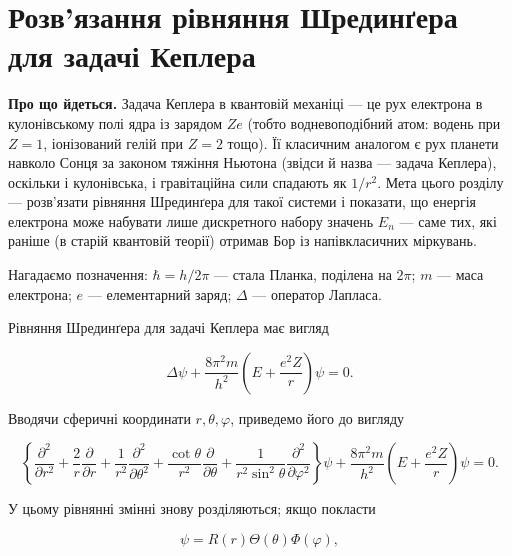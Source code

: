 \documentclass{article}
\begin{document}
\section*{Розв'язання рівняння Шрединґера для задачі Кеплера}

\begin{note}
\textbf{Про що йдеться.} Задача Кеплера в квантовій механіці --- це рух електрона в кулонівському полі ядра із зарядом $Ze$ (тобто водневоподібний атом: водень при $Z=1$, іонізований гелій при $Z=2$ тощо). Її класичним аналогом є рух планети навколо Сонця за законом тяжіння Ньютона (звідси й назва --- задача Кеплера), оскільки і кулонівська, і гравітаційна сили спадають як $1/r^2$. Мета цього розділу --- розв'язати рівняння Шрединґера для такої системи і показати, що енергія електрона може набувати лише дискретного набору значень $E_n$ --- саме тих, які раніше (в старій квантовій теорії) отримав Бор із напівкласичних міркувань.

Нагадаємо позначення: $\hbar = h/2\pi$ --- стала Планка, поділена на $2\pi$; $m$ --- маса електрона; $e$ --- елементарний заряд; $\Delta$ --- оператор Лапласа.
\end{note}

Рівняння Шрединґера для задачі Кеплера має вигляд

\begin{equation}
\Delta \psi + \frac{8\pi^2 m}{h^2} \left( E + \frac{e^2Z}{r} \right) \psi = 0.
\end{equation}

Вводячи сферичні координати \( r, \theta, \varphi \), приведемо його до вигляду

\begin{equation}
\left\{ \frac{\partial^2}{\partial r^2} + \frac{2}{r} \frac{\partial}{\partial r} + \frac{1}{r^2} \frac{\partial^2}{\partial \theta^2} + \frac{\cot \theta}{r^2} \frac{\partial}{\partial \theta} + \frac{1}{r^2 \sin^2 \theta} \frac{\partial^2}{\partial \varphi^2} \right\} \psi +
\frac{8\pi^2 m}{h^2} \left( E + \frac{e^2Z}{r} \right) \psi = 0.
\end{equation}

У цьому рівнянні змінні знову розділяються; якщо покласти

\begin{equation}
\psi = R(r) \Theta(\theta) \Phi(\varphi),
\end{equation}
\end{document}
